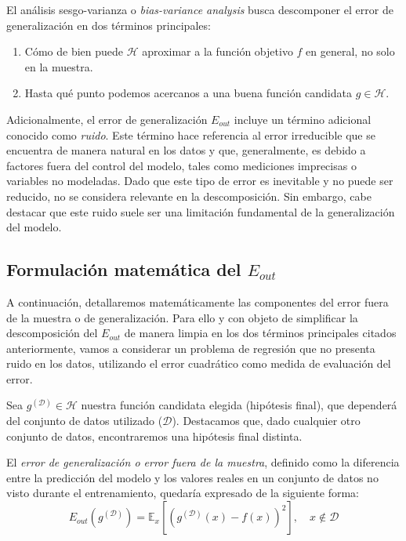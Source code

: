 El análisis sesgo-varianza o \emph{bias-variance analysis} busca descomponer el error de generalización en dos términos principales:

\begin{enumerate}
    \item Cómo de bien puede $\mathcal{H}$ aproximar a la función objetivo $f$ en general, no solo en la muestra.
    \item Hasta qué punto podemos acercanos a una buena función candidata $g \in \mathcal{H}$.\newline
\end{enumerate}

Adicionalmente, el error de generalización $E_{out}$ incluye un término adicional conocido como \textit{ruido}. Este término hace referencia al error irreducible que se encuentra de manera natural en los datos y que, generalmente, es debido a factores fuera del control del modelo, tales como mediciones imprecisas o variables no modeladas. Dado que este tipo de error es inevitable y no puede ser reducido, no se considera relevante en la descomposición. Sin embargo, cabe destacar que este ruido suele ser una limitación fundamental de la generalización del modelo.\newline

\subsection{Formulación matemática del $E_{out}$}\label{sec:formulacion-matematica-Eout}
A continuación, detallaremos matemáticamente las componentes del error fuera de la muestra o de generalización. Para ello y con objeto de simplificar la descomposición del $E_{out}$ de manera limpia en los dos términos principales citados anteriormente, vamos a considerar un problema de regresión que no presenta ruido en los datos, utilizando el error cuadrático como medida de evaluación del error.\newline

Sea $g^{\mathcal{(D)}} \in \mathcal{H}$ nuestra función candidata elegida (hipótesis final), que dependerá del conjunto de datos utilizado ($\mathcal{D}$). Destacamos que, dado cualquier otro conjunto de datos, encontraremos una hipótesis final distinta.\newline

El \emph{error de generalización o error fuera de la muestra}, definido como la diferencia entre la predicción del modelo y los valores reales en un conjunto de datos no visto durante el entrenamiento, quedaría expresado de la siguiente forma:
\begin{equation}\label{eq:E_out1}
    E_{out}(g^{\mathcal{(D)}}) = \mathbb{E}_{x}[{(g^{\mathcal{(D)}}(x) - f(x))}^2], \quad x \notin \mathcal{D}
\end{equation}

